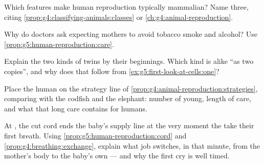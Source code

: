 \begin{exercise}[$\star$]\label{exo:g5:human-reproduction:7}
Which features make human reproduction typically
mammalian? Name three, citing
\cref{prop:g4:classifying-animals:classes} or
\cref{ch:g4:animal-reproduction}.
\end{exercise}

\begin{exercise}[$\star$]\label{exo:g5:human-reproduction:8}
Why do doctors ask expecting mothers to avoid tobacco smoke
and alcohol? Use \cref{prop:g5:human-reproduction:care}.
\end{exercise}

\begin{exercise}[$\star\star$]\label{exo:g5:human-reproduction:9}
Explain the two kinds of twins by their beginnings. Which
kind is alike ``as two copies'', and why does that follow
from \cref{ex:g5:first-look-at-cells:one}?
\end{exercise}

\begin{exercise}[$\star\star$]\label{exo:g5:human-reproduction:10}
Place the human on the strategy line of
\cref{prop:g4:animal-reproduction:strategies}, comparing
with the codfish and the elephant: number of young, length
of care, and what that long care contains for humans.
\end{exercise}

\begin{exercise}[$\star\star\star$]\label{exo:g5:human-reproduction:11}
At , the cut cord ends the baby's supply line at the
very moment the  take their first breath. Using
\cref{prop:g5:human-reproduction:cord} and
\cref{prop:g4:breathing:exchange}, explain what job
switches, in that minute, from the mother's body to the
baby's own  --- and why the first cry is well timed.
\end{exercise}
